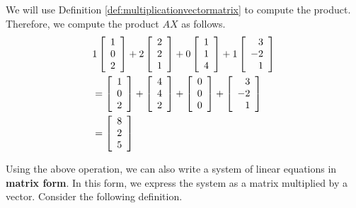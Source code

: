 \begin{solution} We will use Definition \ref{def:multiplicationvectormatrix} to compute the product.
Therefore, we compute the product $AX$ as follows. 
\begin{eqnarray*}
& 1\left[
\begin{array}{r}
1 \\
0 \\
2
\end{array}
\right] + 2\left[
\begin{array}{r}
2 \\
2 \\
1
\end{array}
\right] + 0\left[
\begin{array}{r}
1 \\
1 \\
4
\end{array}
\right] + 1 \left[
\begin{array}{r}
3 \\
-2\\
1
\end{array} 
\right] \\ 
&=
\left[
\begin{array}{r}
1 \\
0 \\
2
\end{array}
\right] + \left[
\begin{array}{r}
4 \\
4 \\
2
\end{array}
\right] + \left[
\begin{array}{r}
0 \\
0 \\
0
\end{array}
\right] +  \left[
\begin{array}{r}
3 \\
-2\\
1
\end{array} 
\right] \\
&=
\left[
\begin{array}{r}
8 \\
2 \\
5
\end{array}
\right]
\end{eqnarray*}
\end{solution}

Using the above operation, we can also write a system of linear equations in \textbf{matrix form}. In this form, 
we express the system as a matrix multiplied by a vector. Consider the following definition.

